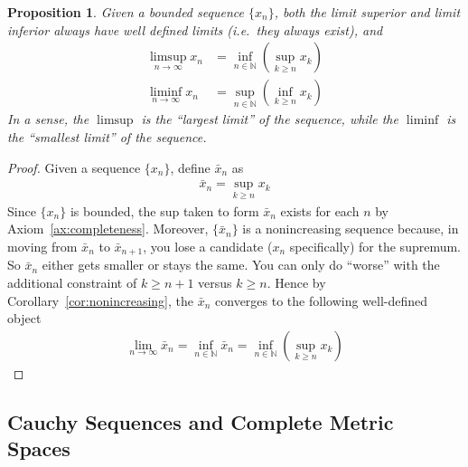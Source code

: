\documentclass[12pt]{article}
\theoremstyle{plain}
\newtheorem{prop}[thm]{Proposition}
\theoremstyle{definition}
\theoremstyle{remark}
\begin{document}
\begin{prop}
Given a bounded sequence $\{x_n\}$,
both the limit superior and limit inferior always have well defined
limits (i.e.\ they always exist), and
\begin{align*}
  \limsup_{n\rightarrow \infty} x_n
  &= \inf_{n\in \mathbb{N}} \left(\sup_{k\geq n} x_k\right)\\
  \liminf_{n\rightarrow \infty} x_n
  &= \sup_{n\in \mathbb{N}} \left(\inf_{k\geq n} x_k\right)
\end{align*}
In a sense, the $\limsup$ is the ``largest limit'' of the sequence,
while the $\liminf$ is the ``smallest limit'' of the sequence.
\end{prop}
\begin{proof}
Given a sequence $\{x_n\}$, define $\bar{x}_n$ as
\begin{align*}
  \bar{x}_n = \sup_{k\geq n} x_k
\end{align*}
Since $\{x_n\}$ is bounded, the sup taken to form $\bar{x}_n$ exists for
each $n$ by Axiom~\ref{ax:completeness}. Moreover, $\{\bar{x}_n\}$ is a
nonincreasing sequence because, in moving from $\bar{x}_n$ to
$\bar{x}_{n+1}$, you lose a candidate ($x_n$ specifically) for the
supremum. So $\bar{x}_n$ either gets smaller or stays the same. You can
only do ``worse'' with the additional constraint of $k\geq n+1$ versus
$k\geq n$. Hence by Corollary~\ref{cor:nonincreasing}, the $\bar{x}_n$
converges to the following well-defined object
\begin{align*}
  \lim_{n\rightarrow \infty}\bar{x}_n
  = \inf_{n\in \mathbb{N}} \bar{x}_n
  = \inf_{n\in \mathbb{N}} \left( \sup_{k\geq n} x_k\right)
\end{align*}
\end{proof}


\subsection{Cauchy Sequences and Complete Metric Spaces}
\end{document}
